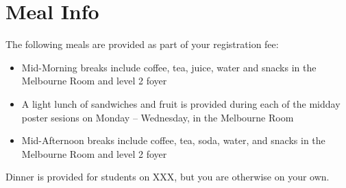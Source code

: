 \setheaders{}{}
\section{Meal Info}{}

The following meals are provided as part of your registration fee:

\begin{itemize}
\item Mid-Morning breaks include coffee, tea, juice, water and snacks
	in the Melbourne Room and level 2 foyer
\item A light lunch of sandwiches and fruit is provided during each
	of the midday poster sesions on Monday -- Wednesday,
	in the Melbourne Room
\item Mid-Afternoon breaks include coffee, tea, soda, water, and 
	snacks in the Melbourne Room and level 2 foyer
\end{itemize}

Dinner is provided for students on XXX, but you are otherwise on
your own.


